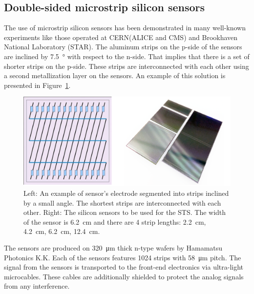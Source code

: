 




\subsection{Double-sided microstrip silicon sensors}
\label{sensors}

The use of microstrip silicon sensors has been demonstrated in many well-known experiments like those operated at \gls{CERN}(\gls{ALICE} and \gls{CMS}) and Brookhaven National Laboratory (\gls{STAR}). The aluminum strips on the p-side of the sensors are inclined by \SI{7.5}{\degree} with respect to the n-side. That implies that there is a set of shorter strips on the p-side. These strips are interconnected with each other using a second metallization layer on the sensors. An example of this solution is presented in Figure~\ref{fig_sts_si}. 

\begin{figure}[!h]
\centering
\includegraphics[width=0.75\columnwidth]{Chapter2/images/silicon_sensors.png}
\caption{Left: An example of sensor's electrode segmented into strips inclined by a small angle. The shortest strips are interconnected with each other. Right: The silicon sensors to be used for the \gls{STS}. The width of the sensor is \SI{6.2}{\centi\metre} and there are 4 strip lengths: \SI{2.2}{\centi\metre}, \SI{4.2}{\centi\metre}, \SI{6.2}{\centi\metre}, \SI{12.4}{\centi\metre}.}
\label{fig_sts_si}
\end{figure}

The sensors are produced on \SI{320}{\micro\metre} thick n-type wafers by Hamamatsu Photonics K.K. Each of the sensors features 1024 strips with \SI{58}{\micro\metre} pitch. The signal from the sensors is transported to the front-end electronics via ultra-light microcables. These cables are additionally shielded to protect the analog signals from any interference. 

